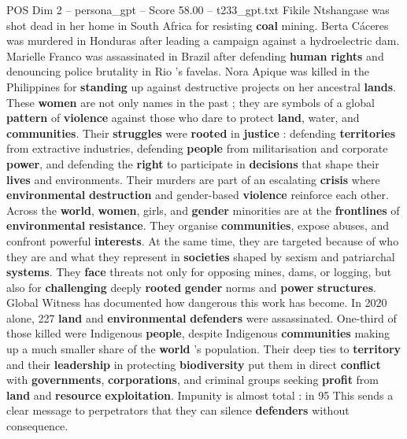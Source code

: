 \begin{textsample}{POS Dim 2 – persona\_gpt – Score 58.00 – t233\_gpt.txt}  \label{ex:f2_pos_016}
Fikile Ntshangase was shot dead in her home in South Africa for resisting \textbf{coal} mining.
Berta Cáceres was murdered in Honduras after leading a campaign against a hydroelectric dam.
Marielle Franco was assassinated in Brazil after defending \textbf{human} \textbf{rights} and denouncing police brutality in Rio ’s favelas.
Nora Apique was killed in the Philippines for \textbf{standing} up against destructive projects on her ancestral \textbf{lands}.
These \textbf{women} are not only names in the past ; they are symbols of a global \textbf{pattern} of \textbf{violence} against those who dare to protect \textbf{land}, water, and \textbf{communities}.
Their \textbf{struggles} were \textbf{rooted} in \textbf{justice} : defending \textbf{territories} from extractive industries, defending \textbf{people} from militarisation and corporate \textbf{power}, and defending the \textbf{right} to participate in \textbf{decisions} that shape their \textbf{lives} and environments.
Their murders are part of an escalating \textbf{crisis} where \textbf{environmental} \textbf{destruction} and gender-based \textbf{violence} reinforce each other.
Across the \textbf{world}, \textbf{women}, girls, and \textbf{gender} minorities are at the \textbf{frontlines} of \textbf{environmental} \textbf{resistance}.
They organise \textbf{communities}, expose abuses, and confront powerful \textbf{interests}.
At the same time, they are targeted because of who they are and what they represent in \textbf{societies} shaped by sexism and patriarchal \textbf{systems}.
They \textbf{face} threats not only for opposing mines, dams, or logging, but also for \textbf{challenging} deeply \textbf{rooted} \textbf{gender} norms and \textbf{power} \textbf{structures}.
Global Witness has documented how dangerous this work has become.
In 2020 alone, 227 \textbf{land} and \textbf{environmental} \textbf{defenders} were assassinated.
One-third of those killed were Indigenous \textbf{people}, despite Indigenous \textbf{communities} making up a much smaller share of the \textbf{world} ’s population.
Their deep ties to \textbf{territory} and their \textbf{leadership} in protecting \textbf{biodiversity} put them in direct \textbf{conflict} with \textbf{governments}, \textbf{corporations}, and criminal groups seeking \textbf{profit} from \textbf{land} and \textbf{resource} \textbf{exploitation}.
Impunity is almost total : in 95 %
This sends a clear message to perpetrators that they can silence \textbf{defenders} without consequence.

\end{textsample}
